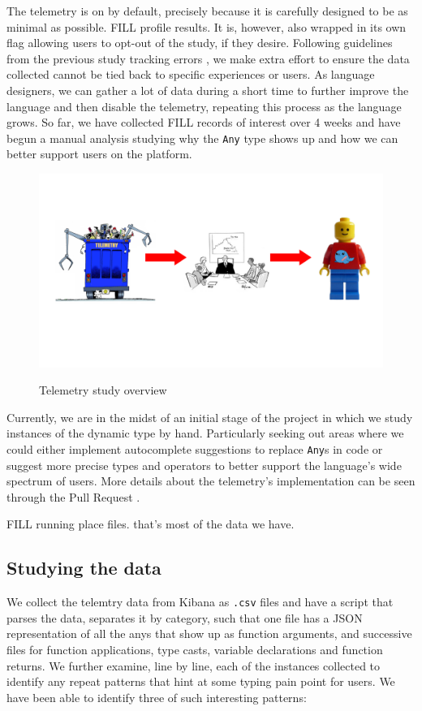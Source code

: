 \documentclass[acmsmall,screen,review,anonymous]{acmart}
\newcommand{\code}[1]{\texttt{#1}}
\newcommand{\Any}{\code{Any}}
\begin{document}
The telemetry is on by default, precisely because it is carefully designed to be as minimal as 
possible. FILL profile results. It is, however, also wrapped in its own flag allowing users to opt-out of the study, 
if they desire. Following guidelines from the previous study tracking errors \cite{gtnffvf-jfp-2019}, we make 
extra effort to ensure the data collected cannot be tied back to specific experiences or users. 
As language designers, we can gather a lot of data during a short time to further improve the 
language and then disable the telemetry, repeating this process as the language grows. So far, we 
have collected FILL records of interest over 4 weeks and have begun a manual 
analysis studying why the \code{Any} type shows up and how we can better support users 
on the platform.

\begin{figure}[t]
  \centering
  {\includegraphics[width=0.66\columnwidth,trim={140 120 140 100}]{src/images/telemetry.pdf}}
  \caption{Telemetry study overview}
  \label{f:approach}
\end{figure}


Currently, we are in the midst of an initial stage of the project in which we study 
instances of the dynamic type by hand. Particularly seeking out areas where 
we could either implement autocomplete suggestions to replace \Any{}s in code or 
suggest more precise types and operators to better support the language's wide 
spectrum of users. More details about the telemetry's implementation can be
seen through the Pull Request \cite{ats_pr}.

FILL running place files. that's most of the data we have.

\subsection{Studying the data}
\label{s:approach:2}
We collect the telemtry data from Kibana as \code{.csv} files and have a script \cite{luau_analysis_script} that parses the data,
separates it by category, such that one file has a JSON representation of all the anys that show up as function 
arguments, and successive files for function applications, type casts, variable declarations and 
function returns. We further examine, line by line, each of the instances collected to identify 
any repeat patterns that hint at some typing pain point for users. We have been able to identify three
of such interesting patterns:
\end{document}
